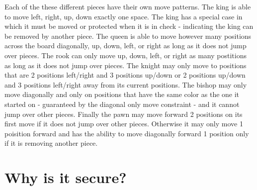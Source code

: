 \documentclass[12pt]{article}
\begin{document}
Each of the these different pieces have their own move patterns. The king is able to move left, right, up, down exactly one space. The king has a special case in which it must be moved or protected when it is in check - indicating the king can be removed by another piece. The queen is able to move however many positions across the board diagonally, up, down, left, or right as long as it does not jump over pieces. The rook can only move up, down, left, or right as many postitions as long as it does not jump over pieces. The knight may only move to positions that are 2 positions left/right and 3 positions up/down or 2 positions up/down and 3 positions left/right away from its current positions. The bishop may only move diagonally and only on positions that have the same color as the one it started on - guaranteed by the diagonal only move constraint - and it cannot jump over other pieces. Finally the pawn may move forward 2 positions on its first move if it does not jump over other pieces. Otherwise it may only move 1 poisition forward and has the ability to move diagonally forward 1 position only if it is removing another piece.

\section{Why is it secure?}
\end{document}
